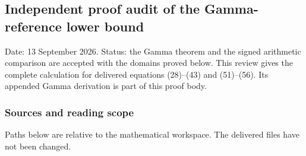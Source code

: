 \subsection{Independent proof audit of the Gamma-reference lower bound}\label{endpoint-gamma_review--independent-proof-audit-of-the-gamma-reference-lower-bound}

Date: 13 September 2026. Status: the Gamma theorem and the signed arithmetic comparison are accepted with the domains proved below. This review gives the complete calculation for delivered equations (28)--(43) and (51)--(56). Its appended Gamma derivation is part of this proof body.

\subsubsection{Sources and reading scope}\label{endpoint-gamma_review--sources-and-reading-scope}

Paths below are relative to the mathematical workspace. The delivered files have not been changed.

